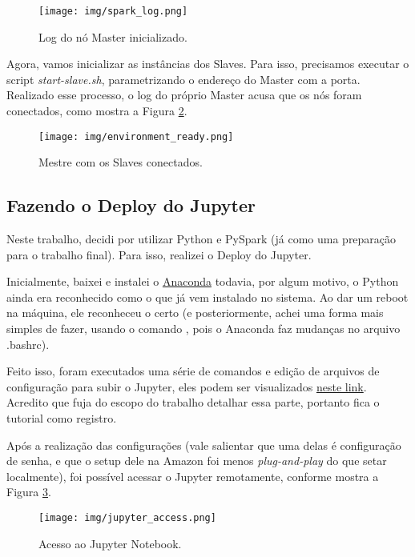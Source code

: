 \documentclass{article}
\begin{document}
\begin{figure}[h]
  \texttt{[image: img/spark\_log.png]}
  \caption{Log do nó Master inicializado.}
  \label{fig:spark_log}
\end{figure}

Agora, vamos inicializar as instâncias dos Slaves. Para isso, precisamos executar o script \emph{start-slave.sh}, parametrizando o endereço do Master com a porta.
Realizado esse processo, o log do próprio Master acusa que os nós foram conectados, como mostra a Figura \ref{fig:env_ready}.

\begin{figure}[h]
  \texttt{[image: img/environment\_ready.png]}
  \caption{Mestre com os Slaves conectados.}
  \label{fig:env_ready}
\end{figure}

\subsection{Fazendo o Deploy do Jupyter}

Neste trabalho, decidi por utilizar Python e PySpark (já como uma preparação para o trabalho final). Para isso, realizei o Deploy do Jupyter.

Inicialmente, baixei e instalei o \href{https://www.anaconda.com/download/#linux}{Anaconda} todavia, por algum motivo, o Python ainda era reconhecido como o que já vem instalado no sistema. Ao dar um reboot na máquina, ele reconheceu o certo (e posteriormente, achei uma forma mais simples de fazer, usando o comando , pois o Anaconda faz mudanças no arquivo .bashrc).

Feito isso, foram executados uma série de comandos e edição de arquivos de configuração para subir o Jupyter, eles podem ser visualizados \href{https://medium.com/@josemarcialportilla/getting-spark-python-and-jupyter-notebook-running-on-amazon-ec2-dec599e1c297}{neste link}. Acredito que fuja do escopo do trabalho detalhar essa parte, portanto fica o tutorial como registro.

Após a realização das configurações (vale salientar que uma delas é configuração de senha, e que o setup dele na Amazon foi menos \emph{plug-and-play} do que setar localmente), foi possível acessar o Jupyter remotamente, conforme mostra a Figura \ref{fig:acess_jupyter}.

\begin{figure}[H]
  \texttt{[image: img/jupyter\_access.png]}
  \caption{Acesso ao Jupyter Notebook.}
  \label{fig:acess_jupyter}
\end{figure}
\end{document}
